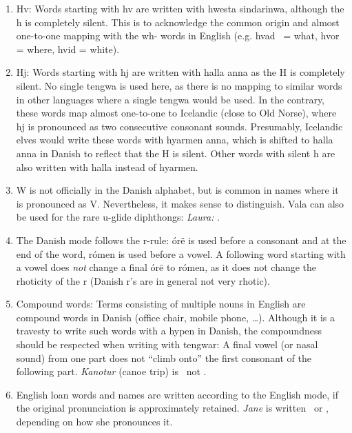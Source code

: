 \documentclass[a4paper]{article}
\begin{document}
\begin{enumerate}
  nuquerna, respectively.  Silm\"e nuquerna without a tetha will thus
  be C, with a tetha it is with high probability an s.  \emph{Cirkus}:
  \Tsilmenuquerna\Toore\TTdot\Tquesse\Tsilmenuquerna\TTrightcurl.\label{noteCS}
  The letter Z is pronounced exactly like S in Danish, but should still
  be written with ess\"e or ess\"e nuquerna.
\item Hv: Words starting with hv are written with hwesta sindarinwa,
  although the h is completely silent.  This is to acknowledge the
  common origin and almost one-to-one mapping with the wh- words in
  English (e.g. hvad \Thwestasindarinwa\Tanto\TTthreedots ~= what,
  hvor  = where, hvid = white).\label{noteHv}
\item Hj: Words starting with hj are written with halla anna as the H
  is completely silent.  No single tengwa is used here, as there is no
  mapping to similar words in other languages where a single tengwa
  would be used.  In the contrary, these words map almost one-to-one
  to Icelandic (close to Old Norse), where hj is pronounced as two
  consecutive consonant sounds.  Presumably, Icelandic elves would
  write these words with hyarmen anna, which is shifted to halla anna
  in Danish to reflect that the H is silent.  Other words with silent
  h are also written with halla instead of hyarmen.\label{notehalla}
\item W is not officially in the Danish alphabet, but is common in
  names where it is pronounced as V.  Nevertheless, it makes sense to
  distinguish.  Vala can also be used for the rare u-glide diphthongs:
  \emph{Laura:} \Tlambe\Tvala\TTthreedots\Troomen\Ttelco\TTthreedots.\label{noteW}
\item The Danish mode follows the r-rule: \'or\"e is used before a
  consonant and at the end of the word, r\'omen is used before a
  vowel.  A following word starting with a vowel does \emph{not}
  change a final \'or\"e to r\'omen, as it does not change the
  rhoticity of the r (Danish r's are in general not very rhotic).\label{noteR}
\item Compound words: Terms consisting of multiple nouns in English
  are compound words in Danish (office chair, mobile phone, \ldots).
  Although it is a travesty to write such words with a hypen in
  Danish, the compoundness should be respected when writing with
  tengwar: A final vowel (or nasal sound) from one part does not
  ``climb onto'' the first consonant of the following part.
  \emph{Kanotur} (canoe trip) is
  \Tquesse\Tnuumen\TTthreedots\Ttelco\TTrightcurl
  \Ttinco\Toore\TTleftcurl ~not
  \Tquesse\Tnuumen\TTthreedots\Ttinco\TTrightcurl\Toore\TTleftcurl.
\item English loan words and names are written according to the
  English mode, if the original pronunciation is approximately
  retained.  \emph{Jane} is written
  \Tanga\Tnuumen\TTthreedots\TTdotbelow ~or
  \Tanna\Tnuumen\TTthreedots\Ttelco\TTacute, depending on how she
  pronounces it.
\end{enumerate}
\end{document}
